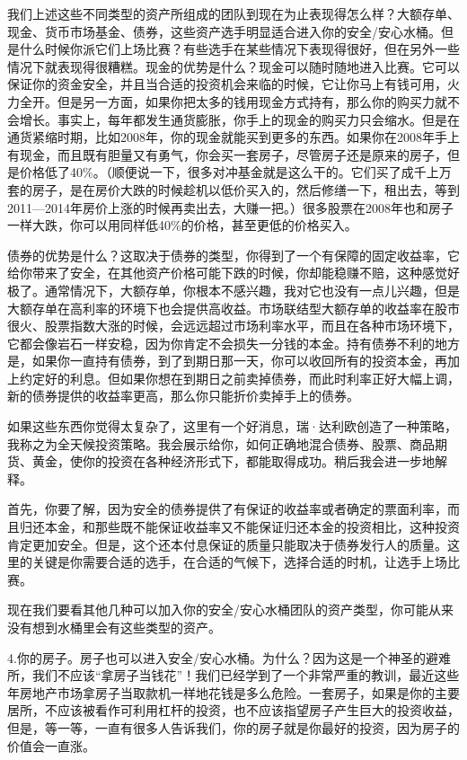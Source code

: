 我们上述这些不同类型的资产所组成的团队到现在为止表现得怎么样？大额存单、现金、货币市场基金、债券，这些资产选手明显适合进入你的安全/安心水桶。但是什么时候你派它们上场比赛？有些选手在某些情况下表现得很好，但在另外一些情况下就表现得很糟糕。现金的优势是什么？现金可以随时随地进入比赛。它可以保证你的资金安全，并且当合适的投资机会来临的时候，它让你马上有钱可用，火力全开。但是另一方面，如果你把太多的钱用现金方式持有，那么你的购买力就不会增长。事实上，每年都发生通货膨胀，你手上的现金的购买力只会缩水。但是在通货紧缩时期，比如2008年，你的现金就能买到更多的东西。如果你在2008年手上有现金，而且既有胆量又有勇气，你会买一套房子，尽管房子还是原来的房子，但是价格低了40\%。（顺便说一下，很多对冲基金就是这么干的。它们买了成千上万套的房子，是在房价大跌的时候趁机以低价买入的，然后修缮一下，租出去，等到2011—2014年房价上涨的时候再卖出去，大赚一把。）很多股票在2008年也和房子一样大跌，你可以用同样低40\%的价格，甚至更低的价格买入。

债券的优势是什么？这取决于债券的类型，你得到了一个有保障的固定收益率，它给你带来了安全，在其他资产价格可能下跌的时候，你却能稳赚不赔，这种感觉好极了。通常情况下，大额存单，你根本不感兴趣，我对它也没有一点儿兴趣，但是大额存单在高利率的环境下也会提供高收益。市场联结型大额存单的收益率在股市很火、股票指数大涨的时候，会远远超过市场利率水平，而且在各种市场环境下，它都会像岩石一样安稳，因为你肯定不会损失一分钱的本金。持有债券不利的地方是，如果你一直持有债券，到了到期日那一天，你可以收回所有的投资本金，再加上约定好的利息。但如果你想在到期日之前卖掉债券，而此时利率正好大幅上调，新的债券提供的收益率更高，那么你只能折价卖掉手上的债券。

如果这些东西你觉得太复杂了，这里有一个好消息，瑞·达利欧创造了一种策略，我称之为全天候投资策略。我会展示给你，如何正确地混合债券、股票、商品期货、黄金，使你的投资在各种经济形式下，都能取得成功。稍后我会进一步地解释。

首先，你要了解，因为安全的债券提供了有保证的收益率或者确定的票面利率，而且归还本金，和那些既不能保证收益率又不能保证归还本金的投资相比，这种投资肯定更加安全。但是，这个还本付息保证的质量只能取决于债券发行人的质量。这里的关键是你需要合适的选手，在合适的气候下，选择合适的时机，让选手上场比赛。

现在我们要看其他几种可以加入你的安全/安心水桶团队的资产类型，你可能从来没有想到水桶里会有这些类型的资产。

4.你的房子。房子也可以进入安全/安心水桶。为什么？因为这是一个神圣的避难所，我们不应该“拿房子当钱花”！我们已经学到了一个非常严重的教训，最近这些年房地产市场拿房子当取款机一样地花钱是多么危险。一套房子，如果是你的主要居所，不应该被看作可利用杠杆的投资，也不应该指望房子产生巨大的投资收益，但是，等一等，一直有很多人告诉我们，你的房子就是你最好的投资，因为房子的价值会一直涨。

